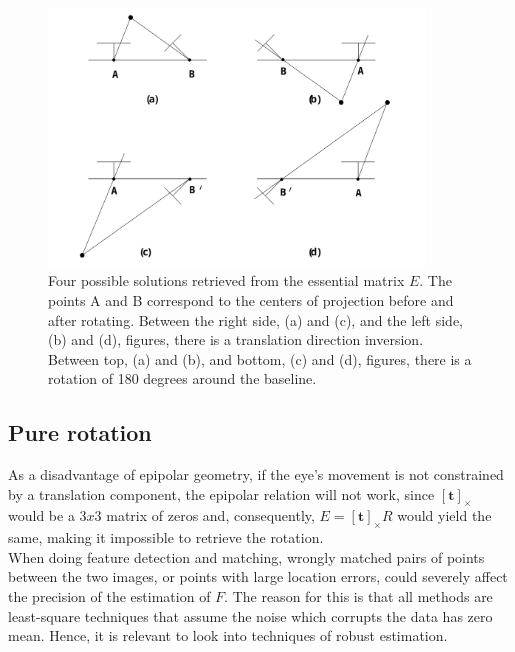 \begin{figure}[ht]
	\centering
	\includegraphics[width=10cm]{images/ep4sols.png}
	\caption[Four possible solutions retrieved from $E$]{Four possible solutions retrieved from the essential matrix $E$. The points A and B correspond to the centers of projection before and after rotating. Between the right side, (a) and (c), and the left side, (b) and (d), figures, there is a translation direction inversion. Between top, (a) and (b), and bottom, (c) and (d), figures, there is a rotation of 180 degrees around the baseline. \cite{multiview}}
	\label{sec2:fig:ep4}
\end{figure}

\subsection{Pure rotation}
\label{urerrrrr}
As a disadvantage of epipolar geometry, if the eye's movement is not constrained by a translation component, the epipolar relation will not work, since $[\mathbf{t}]_\times$ would be a $3x3$ matrix of zeros and, consequently, $E = [\mathbf{t}]_\times R$ would yield the same, making it impossible to retrieve the rotation.\\

When doing feature detection and matching, wrongly matched pairs of points between the two images, or points with large location errors, could severely affect the precision of the estimation of $F$. The reason for this is that all methods are least-square techniques that assume the noise which corrupts the data has zero mean. Hence, it is relevant to look into techniques of robust estimation.

